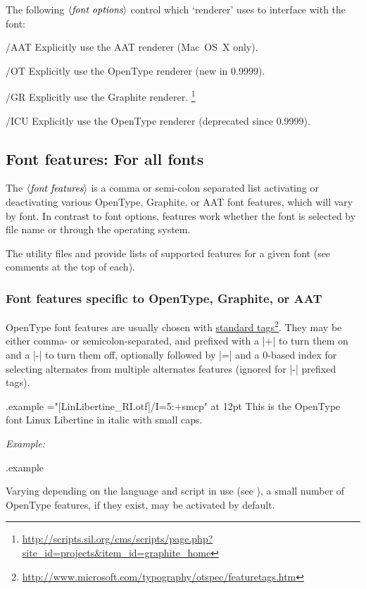 \documentclass[12pt]{article}
\newcommand\xetex  {\hologo{XeTeX}\xspace}
\newenvironment{optdesc}
  {\begin{description}[font=\ttfamily,style=nextline,leftmargin=1.5cm]}
  {\end{description}}
\newcommand\xarg[1]{$\langle\hbox{\rmfamily\itshape #1}\rangle$}
\edef\examplefilename{\jobname.example}
\newlength\exampleindent
\newenvironment{example}
  {\VerbatimEnvironment
   \begin{VerbatimOut}{\examplefilename}}
  {\end{VerbatimOut}
   \typesetexample}
\newcommand\typesetexample{%
  \begin{trivlist}\item[]
  \vrule
  \hspace{\exampleindent}
  \begin{minipage}{\linewidth-\exampleindent-\exampleindent}
    \textit{Example:}\par
    \vspace{0.4\baselineskip}
    \BVerbatimInput[fontsize=\small]{\examplefilename}\par
    \vspace{0.4\baselineskip}
    \color[rgb]{0.7,0,0}\examplefilename\relax
  \end{minipage}\par
  \end{trivlist}}
\newcommand\hlink[2]{\href{#1}{#2}\footnote{\url{#1}}}
\begin{document}
The following \xarg{font options} control which `renderer' \xetex uses to interface with the font:
\begin{optdesc}
\item[/AAT] Explicitly use the AAT renderer (Mac~OS~X only).
\item[/OT] Explicitly use the OpenType renderer (new in 0.9999).
\item[/GR] Explicitly use the Graphite renderer.%
           \footnote{\url{http://scripts.sil.org/cms/scripts/page.php?site_id=projects&item_id=graphite_home}}
\item[/ICU] Explicitly use the OpenType renderer (deprecated since 0.9999).
\end{optdesc}


\subsection{Font features: For all fonts}

The \xarg{font features} is a comma or semi-colon separated list
activating or deactivating various OpenType, Graphite, or AAT font
features, which will vary by font.  In contrast to font options,
features work whether the font is selected by file name or through the
operating system.

The \xetex utility files  and
 provide lists of supported features for a given
font (see comments at the top of each).

\subsubsection{Font features specific to OpenType, Graphite, or AAT}

OpenType font features are usually chosen with
\hlink{http://www.microsoft.com/typography/otspec/featuretags.htm}{standard
tags}. They may be either comma- or semicolon-separated, and prefixed
with a |+| to turn them on and a |-| to turn them off, optionally followed
by |=| and a 0-based index for selecting alternates from multiple
alternates features (ignored for |-| prefixed tags).

\begin{example}
\font\liber="[LinLibertine_RI.otf]/I=5:+smcp" at 12pt
\liber This is the OpenType font Linux Libertine in italic with small caps.
\end{example}

Varying depending on the language and script in use (see
), a small number of OpenType features, if they
exist, may be activated by default.
\end{document}
